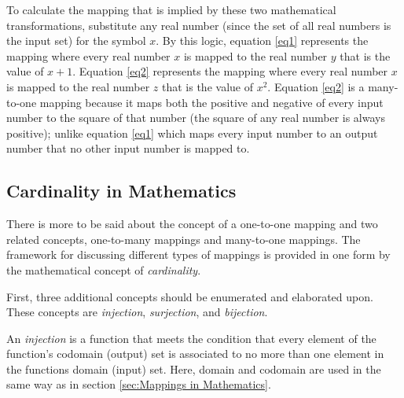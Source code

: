 To calculate the mapping that is implied by these two mathematical transformations, substitute any real number (since the set of all real numbers is the input set) for the symbol \begin{math}x\end{math}. By this logic, equation \ref{eq1} represents the mapping where every real number \begin{math}x\end{math} is mapped to the real number \begin{math}y\end{math} that is the value of \begin{math}x + 1\end{math}. Equation \ref{eq2} represents the mapping where every real number \begin{math}x\end{math} is mapped to the real number \begin{math}z\end{math} that is the value of \begin{math}x^{2}\end{math}. Equation \ref{eq2} is a many-to-one mapping because it maps both the positive and negative of every input number to the square of that number (the square of any real number is always positive); unlike equation \ref{eq1} which maps every input number to an output number that no other input number is mapped to.

\subsection{Cardinality in Mathematics}

There is more to be said about the concept of a one-to-one mapping and two related concepts, one-to-many mappings and many-to-one mappings. The framework for discussing different types of mappings is provided in one form by the mathematical concept of \emph{cardinality}.

First, three additional concepts should be enumerated and elaborated upon. These concepts are \emph{injection}, \emph{surjection}, and \emph{bijection}.

An \emph{injection} is a function that meets the condition that every element of the function's codomain (output) set is associated to no more than one element in the functions domain (input) set. Here, domain and codomain are used in the same way as in section \ref{sec:Mappings in Mathematics}.

